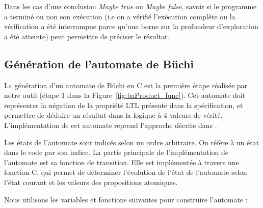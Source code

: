 Dans les cas d'une conclusion \emph{Maybe true} ou \emph{Maybe false},
savoir si le programme a terminé ou non son exécution (i.e on a vérifié
l'exécution complète ou la vérification a été interrompue parce qu'une borne sur
la profondeur d'exploration a été atteinte) peut permettre de préciser le résultat.

\subsection{Génération de l'automate de Büchi}

La génération d'un automate de Büchi en C est la première étape réalisée par
notre outil (étape 1 dans la Figure~\ref{fig:baProduct_func}). Cet automate doit
représenter la négation de la propriété \ac{LTL} présente dans la spécification,
et permettre de déduire un résultat dans la logique à 4 valeurs de vérité.
L'implémentation de cet automate reprend l'approche décrite dans
\cite{morse_ltl}.

Les états de l'automate sont indicés selon un ordre arbitraire. On réfère à un
état dans le code par son indice. La partie principale de l'implémentation de
l'automate est sa fonction de transition. Elle est implémentée à travers une
fonction C, qui permet de déterminer l'évolution de l'état de l'automate selon
l'état courant et les valeurs des propositions atomiques.

Nous utilisons les variables et fonctions suivantes pour construire l'automate :

